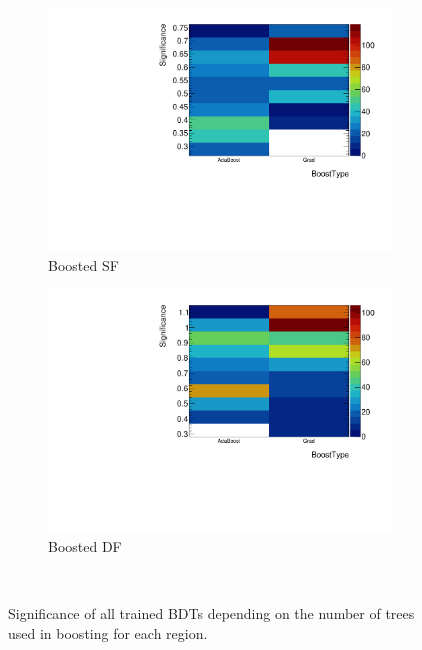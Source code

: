 \begin{figure}[htb]
\begin{subfigure}[t]{0.45\textwidth}
        \includegraphics[width=\textwidth,page=2]{./plots/mva/scan/BOOST_SF_setting_vs_binned_sig.pdf}
        \caption{Boosted SF}
    \end{subfigure}
    \begin{subfigure}[t]{0.45\textwidth}
        \includegraphics[width=\textwidth,page=2]{./plots/mva/scan/BOOST_DF_setting_vs_binned_sig.pdf}
        \caption{Boosted DF}
    \end{subfigure}
    \caption{Significance of all trained BDTs depending on the number of trees used in boosting for each region.}~\label{fig:mva:scan:ntrees}
\end{figure}

